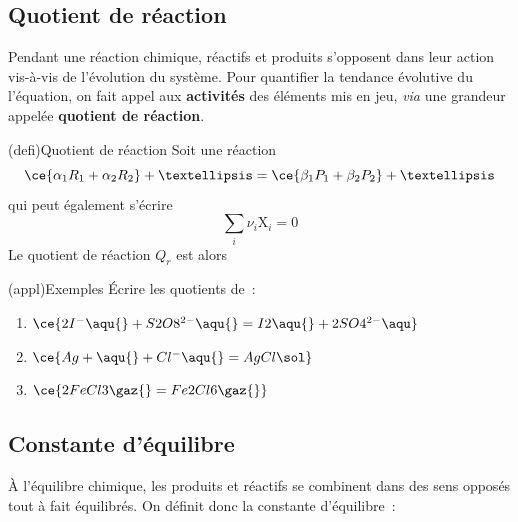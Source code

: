 \documentclass[../../main/main.tex]{subfiles}
\begin{document}
\subsection{Quotient de réaction}

Pendant une réaction chimique, réactifs et produits s'opposent dans leur action
vis-à-vis de l'évolution du système.
Pour quantifier la tendance évolutive du l'équation, on fait appel aux
\textbf{activités} des éléments mis en jeu, \textit{via} une grandeur appelée
\textbf{quotient de réaction}.

\begin{tcb}[label=quoreac](defi){Quotient de réaction}
	Soit une réaction
	\[\ce{\alpha_1R_1 + \alpha_2R_2} +…
		=
		\ce{\beta_1P_1 +\beta_2P_2}+…\]
	qui peut également s'écrire
	\[ \sum_i \nu_i\mathrm{X}_i = 0\]
	Le quotient de réaction $Q_r$ est alors
	\csw{
		\[
			\boxed{Q_r = \frac{a(\ce{P_1})^{\beta_1} \times
					a(\ce{P_2})^{\beta_2} \times…}{
					a(\ce{R_1})^{\alpha_1} \times
					a(\ce{R_2})^{\alpha_2} \times…}}
			\qou
			\boxed{Q_r = \prod_i a(\ce{X_i})^{\nu_i}}
		\]
	}
\end{tcb}

\begin{tcb}[label=exem:qr, sidebyside, righthand ratio=.45](appl){Exemples}
	Écrire les quotients de~:
	\begin{enumerate}
		\item $\ce{2I^-\aqu{} + S2O8^{2-}\aqu{} = I2\aqu{} +2SO4^{2-}\aqu}$
		\item $\ce{Ag+\aqu{} + Cl^-\aqu{} = AgCl\sol}$
		\item $\ce{2FeCl3\gaz{} = Fe2Cl6\gaz{}}$
	\end{enumerate}
	\tcblower
	\vspace{+15pt}
	\begin{enumerate}
		\mitem
		\csw{
			\[
				Q_r = \frac{
					[\ce{I2}]\times[\ce{SO4^{2-}}]^2
				}{
					[\ce{I-}]^2\times [\ce{S2O8^{2-}}]
				}
			\]
		}
		\mitem
		\csw{
			\[
				Q_r =
				\frac{c\degree^2
				}{
					[\ce{Ag+}]\times[\ce{Cl-}]
				}
			\]
		}
		\mitem
		\csw{
			\[
				Q_r = \frac{P_{\ce{Fe2Cl6}}/P\degree
				}{
					P_{\ce{FeCl3}}{}^2/P\degree{}^2}
				=
				P\degree\frac{P_{\ce{Fe2Cl6}}
				}{
					P_{\ce{FeCl3}}{}^2
				}
			\]
		}
	\end{enumerate}
	\vspace{-15pt}
\end{tcb}

\subsection{Constante d'équilibre}
À l'équilibre chimique, les produits et réactifs se combinent dans des sens
opposés tout à fait équilibrés. On définit donc la constante d'équilibre~:
\end{document}
